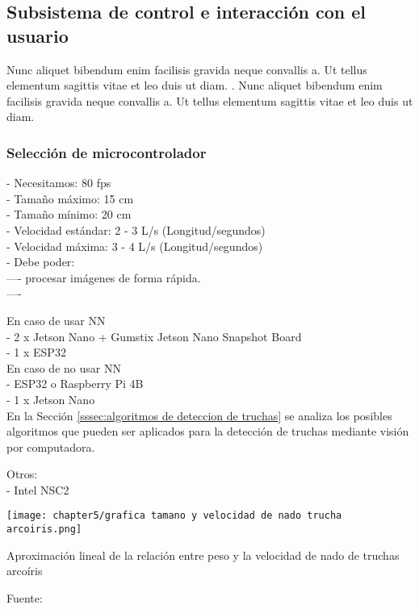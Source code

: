 \subsection{Subsistema de control e interacción con el usuario}
\label{ssec:subsistema de control e interaccion con el usuario}

Nunc aliquet bibendum enim facilisis gravida neque convallis a. Ut tellus elementum sagittis vitae et leo duis ut diam. . Nunc aliquet bibendum enim facilisis gravida neque convallis a. Ut tellus elementum sagittis vitae et leo duis ut diam. 


\subsubsection{Selección de microcontrolador}
\label{sssec:seleccion de microcontrolador}

- Necesitamos: 80 fps \\
- Tamaño máximo: 15 cm \\
- Tamaño mínimo: 20 cm \\
- Velocidad estándar: 2 - 3 L/s (Longitud/segundos) \\
- Velocidad máxima: 3 - 4 L/s (Longitud/segundos) \\
- Debe poder: \\
---- procesar imágenes de forma rápida. \\
----  

En caso de usar NN \\
- 2 x Jetson Nano + Gumstix Jetson Nano Snapshot Board \\
- 1 x ESP32 \\

En caso de no usar NN \\
- ESP32 o Raspberry Pi 4B \\
- 1 x Jetson Nano \\

En la Sección \ref{sssec:algoritmos de deteccion de truchas}  se analiza los posibles algoritmos que pueden ser aplicados para la detección de truchas mediante visión por computadora.

Otros:\\
- Intel NSC2 \\

\begin{myfigure}[H]
	\centering
	\texttt{[image: chapter5/grafica tamano y velocidad de nado trucha arcoiris.png]}
	\caption{Aproximación lineal de la relación entre peso y la velocidad de nado de truchas arcoíris}
	\begin{myflushleftportland}
		Fuente: \cite{Fry1970}
	\end{myflushleftportland}
	\label{fig:grafica tamano y velocidad de nado trucha arcoiris}
\end{myfigure}


